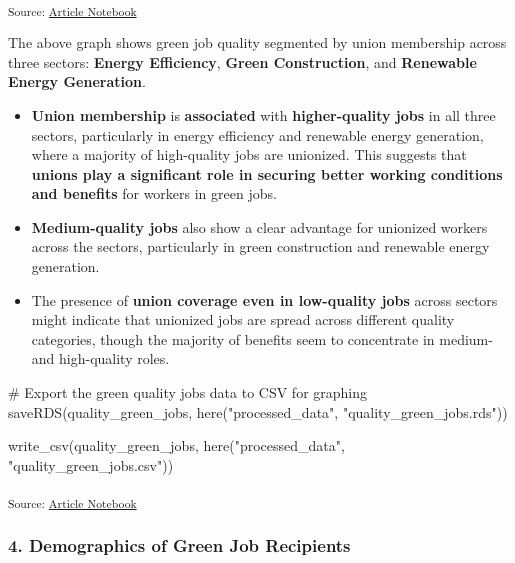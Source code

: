 \documentclass[
  letterpaper,
  DIV=11,
  numbers=noendperiod]{scrartcl}
\newenvironment{Shaded}{\begin{snugshade}}{\end{snugshade}}
\newcommand{\CommentTok}[1]{\textcolor[rgb]{0.37,0.37,0.37}{#1}}
\newcommand{\FunctionTok}[1]{\textcolor[rgb]{0.28,0.35,0.67}{#1}}
\newcommand{\NormalTok}[1]{\textcolor[rgb]{0.00,0.23,0.31}{#1}}
\newcommand{\StringTok}[1]{\textcolor[rgb]{0.13,0.47,0.30}{#1}}
\begin{document}
\textsubscript{Source:
\href{https://beeckcenter.github.io/climate-equity-workforce/index-preview.html}{Article
Notebook}}

The above graph shows green job quality segmented by union membership
across three sectors: \textbf{Energy Efficiency}, \textbf{Green
Construction}, and \textbf{Renewable Energy Generation}.

\begin{itemize}
\item
  \textbf{Union membership} is \textbf{associated} with
  \textbf{higher-quality jobs} in all three sectors, particularly in
  energy efficiency and renewable energy generation, where a majority of
  high-quality jobs are unionized. This suggests that \textbf{unions
  play a significant role in securing better working conditions and
  benefits} for workers in green jobs.
\item
  \textbf{Medium-quality jobs} also show a clear advantage for unionized
  workers across the sectors, particularly in green construction and
  renewable energy generation.
\item
  The presence of \textbf{union coverage even in low-quality jobs}
  across sectors might indicate that unionized jobs are spread across
  different quality categories, though the majority of benefits seem to
  concentrate in medium- and high-quality roles.
\end{itemize}

\begin{Shaded}
\begin{Highlighting}[]
\CommentTok{\# Export the green quality jobs data to CSV for graphing}
\FunctionTok{saveRDS}\NormalTok{(quality\_green\_jobs, }\FunctionTok{here}\NormalTok{(}\StringTok{"processed\_data"}\NormalTok{, }\StringTok{"quality\_green\_jobs.rds"}\NormalTok{))}

\FunctionTok{write\_csv}\NormalTok{(quality\_green\_jobs, }\FunctionTok{here}\NormalTok{(}\StringTok{"processed\_data"}\NormalTok{, }\StringTok{"quality\_green\_jobs.csv"}\NormalTok{))}
\end{Highlighting}
\end{Shaded}

\textsubscript{Source:
\href{https://beeckcenter.github.io/climate-equity-workforce/index-preview.html}{Article
Notebook}}

\subsubsection{4. Demographics of Green Job
Recipients}\label{demographics-of-green-job-recipients}
\end{document}
